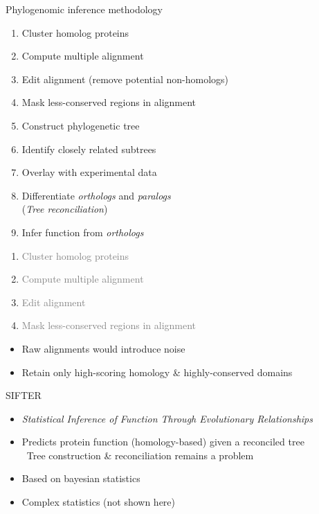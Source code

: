 \documentclass[14pt,xcolor=dvipsnames,pdftex]{beamer}
\begin{document}
\begin{frame}[allowframebreaks]{Phylogenomic inference methodology}
 \begin{enumerate}
  \item Cluster homolog proteins
  \item Compute multiple alignment
  \item Edit alignment (remove potential non-homologs)
  \item Mask less-conserved regions in alignment
  \item Construct phylogenetic tree
  \item Identify closely related subtrees
  \item Overlay with experimental data
  \item Differentiate \textit{orthologs} and \textit{paralogs}\\
	(\textit{Tree reconciliation})
  \item Infer function from \textit{orthologs}
 \end{enumerate}
 \framebreak
 \begin{enumerate}
   \item \textcolor{gray}{Cluster homolog proteins}
   \item \textcolor{gray}{Compute multiple alignment}
   \item \textcolor{gray}{Edit alignment}
   \item \textcolor{gray}{Mask less-conserved regions in alignment}
 \end{enumerate}
 \begin{itemize}
  \item Raw alignments would introduce noise
  \item Retain only high-scoring homology \& highly-conserved domains
 \end{itemize}
\end{frame}


\begin{frame}{SIFTER}
\begin{itemize}
 \item \textit{Statistical Inference of Function Through Evolutionary Relationships}
 \item Predicts protein function (homology-based) given a reconciled tree\\
 \textrightarrow\ Tree construction \& reconciliation remains a problem
 \item Based on bayesian statistics
 \item Complex statistics (not shown here)
\end{itemize}
\end{frame}
\end{document}
